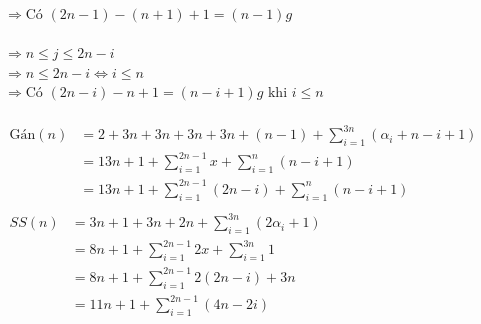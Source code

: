 \documentclass[12pt, letterpaper]{article}
\begin{document}
$\Rightarrow \text{Có } (2n - 1) - (n + 1) + 1 = (n - 1)g$ \\
 \\
$\Rightarrow n \leq j \leq 2n - i$ \\
$\Rightarrow n \leq 2n - i \Leftrightarrow i \leq n$ \\
$\Rightarrow \text{Có } (2n - i) - n + 1 = (n - i + 1)g \text{ khi } i \leq n$\\
 \\
$ \begin{aligned}
		\text{Gán}(n) & = 2 + 3n + 3n + 3n + 3n + (n - 1) + \sum^{3n}_{i = 1} (\alpha_i + n - i + 1) \\
		              & = 13n + 1 + \sum^{2n-1}_{i = 1} x + \sum^{n}_{i = 1} (n - i + 1)             \\
		              & = 13n + 1 + \sum^{2n-1}_{i = 1} (2n - i) + \sum^{n}_{i = 1} (n - i + 1)      \\
	\end{aligned} $ \\
$ \begin{aligned}
		SS(n) & = 3n + 1 + 3n + 2n + \sum^{3n}_{i = 1} (2 \alpha_i + 1) \\
		      & = 8n + 1 +\sum^{2n-1}_{i = 1} 2x + \sum^{3n}_{i = 1} 1  \\
		      & = 8n + 1 +\sum^{2n-1}_{i = 1} 2(2n - i) + 3n            \\
		      & = 11n + 1 +\sum^{2n-1}_{i = 1} (4n - 2i)                \\
	\end{aligned} $ \\
\end{document}
